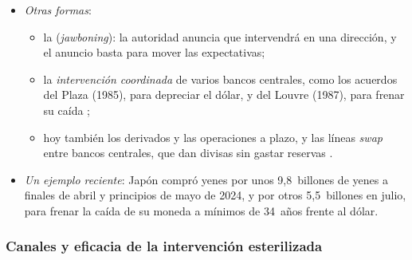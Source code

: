 \documentclass[11pt]{article}
\begin{document}
\begin{itemize}
\item \emph{Otras formas}:
  \begin{itemize}
  \item la  (\emph{jawboning}): la autoridad anuncia que intervendrá en una dirección, y el anuncio basta para mover las expectativas;
  \item la \emph{intervención coordinada} de varios bancos centrales, como los acuerdos del Plaza (1985), para depreciar el dólar, y del Louvre (1987), para frenar su caída\nocite{DominguezFrankel1993Does}  ;
  \item hoy también los derivados y las operaciones a plazo, y las líneas \emph{swap} entre bancos centrales, que dan divisas sin gastar reservas .
  \end{itemize}
\item \emph{Un ejemplo reciente}: Japón compró yenes por unos 9,8~billones de yenes a finales de abril y principios de mayo de 2024, y por otros 5,5~billones en julio, para frenar la caída de su moneda a mínimos de 34~años frente al dólar\nocite{MOF2024Intervencion}.
\end{itemize}

\subsubsection{Canales y eficacia de la intervención esterilizada}\label{sec:intervencion-canales}
\end{document}
